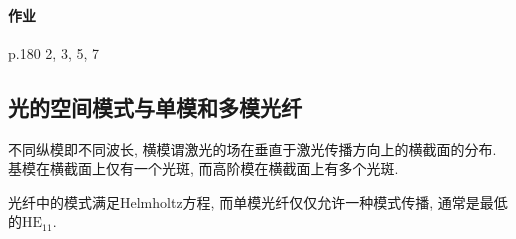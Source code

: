 \documentclass{ctexart}
\begin{document}
\paragraph{作业} %
\label{par:作业}

p.180 2, 3, 5, 7




\subsection{光的空间模式与单模和多模光纤} %
\label{sub:光的空间模式与单模和多模光纤}

不同纵模即不同波长, 横模谓激光的场在垂直于激光传播方向上的横截面的分布. 基模在横截面上仅有一个光斑, 而高阶模在横截面上有多个光斑.
\par
光纤中的模式满足Helmholtz方程, 而单模光纤仅仅允许一种模式传播, 通常是最低的$\mathrm{HE}_{11}$.


\end{document}
